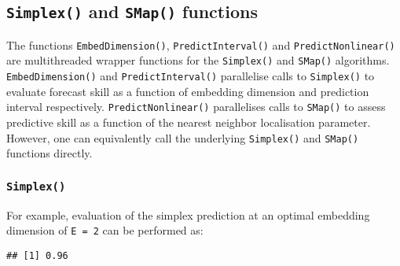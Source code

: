 \documentclass[]{article}
\newenvironment{Shaded}{\begin{snugshade}}{\end{snugshade}}
\newcommand{\DataTypeTok}[1]{\textcolor[rgb]{0.13,0.29,0.53}{#1}}
\newcommand{\DecValTok}[1]{\textcolor[rgb]{0.00,0.00,0.81}{#1}}
\newcommand{\KeywordTok}[1]{\textcolor[rgb]{0.13,0.29,0.53}{\textbf{#1}}}
\newcommand{\NormalTok}[1]{#1}
\newcommand{\OperatorTok}[1]{\textcolor[rgb]{0.81,0.36,0.00}{\textbf{#1}}}
\newcommand{\StringTok}[1]{\textcolor[rgb]{0.31,0.60,0.02}{#1}}
\begin{document}
\hypertarget{simplex-and-smap-functions}{%
\subsection{\texorpdfstring{\texttt{Simplex()} and \texttt{SMap()}
functions}{Simplex() and SMap() functions}}\label{simplex-and-smap-functions}}

The functions \texttt{EmbedDimension()}, \texttt{PredictInterval()} and
\texttt{PredictNonlinear()} are multithreaded wrapper functions for the
\texttt{Simplex()} and \texttt{SMap()} algorithms.
\texttt{EmbedDimension()} and \texttt{PredictInterval()} parallelise
calls to \texttt{Simplex()} to evaluate forecast skill as a function of
embedding dimension and prediction interval respectively.
\texttt{PredictNonlinear()} parallelises calls to \texttt{SMap()} to
assess predictive skill as a function of the nearest neighbor
localisation parameter. However, one can equivalently call the
underlying \texttt{Simplex()} and \texttt{SMap()} functions directly.

\hypertarget{simplex}{%
\subsubsection{\texorpdfstring{\texttt{Simplex()}}{Simplex()}}\label{simplex}}

For example, evaluation of the simplex prediction at an optimal
embedding dimension of \texttt{E\ =\ 2} can be performed as:

\begin{Shaded}
\end{Shaded}

\begin{verbatim}
## [1] 0.96
\end{verbatim}
\end{document}
